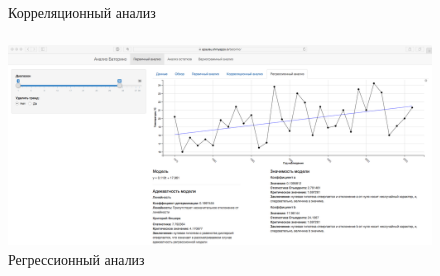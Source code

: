 \documentclass[10pt,pdf,aspectratio=169,hyperref={unicode},notheorems]{beamer}
\theoremstyle{definition}
\theoremstyle{example}
\theoremstyle{plain}
\begin{document}
\begin{frame}
  \frametitle{\large\secname}
  \framesubtitle{\subsecname}
  \begin{figure}[h]
    \caption{Корреляционный анализ}
  \end{figure}
\end{frame}

\begin{frame}
  \frametitle{\large\secname}
  \framesubtitle{\subsecname}
    \begin{figure}[h]
    \includegraphics[width=1\textwidth]{../../figures/static/2_regr.png}
    \caption{Регрессионный анализ}
  \end{figure}
\end{frame}
\end{document}
